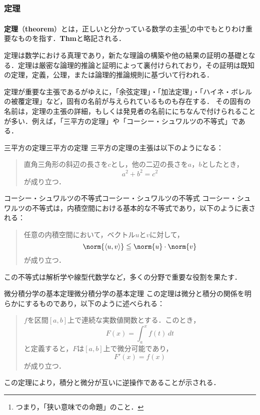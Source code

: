 \documentclass[a4paper,11pt]{ltjsarticle}
\renewcommand{\emph}[1]{\textbf{#1}}
\renewcommand{\leq}{\leqq}
\begin{document}
\subsubsection{定理}

\emph{定理}（\emph{theorem}）とは，正しいと分かっている数学の主張\footnote{つまり，「狭い意味での命題」のこと．}の中でもとりわけ重要なものを指す．\textbf{Thm}と略記される．


定理は数学における真理であり，新たな理論の構築や他の結果の証明の基礎となる．定理は厳密な論理的推論と証明によって裏付けられており，その証明は既知の定理，定義，公理，または論理的推論規則に基づいて行われる．

定理が重要な主張であるがゆえに，「余弦定理」・「加法定理」・「ハイネ・ボレルの被覆定理」など，固有の名前が与えられているものも存在する．
その固有の名前は，定理の主張の詳細，もしくは発見者の名前ににちなんで付けられることが多い．例えば，「三平方の定理」や「コーシー・シュワルツの不等式」である．

\begin{example}{三平方の定理}{三平方の定理}
	三平方の定理の主張は以下のようになる：
	\begin{quotation}
    直角三角形の斜辺の長さを$c$とし，他の二辺の長さを$a$，$b$としたとき，
    \[
        a^2+b^2=c^2
    \]
    が成り立つ．
\end{quotation}
\end{example}
  
  \begin{example}{コーシー・シュワルツの不等式}{コーシー・シュワルツの不等式}
  コーシー・シュワルツの不等式は，内積空間における基本的な不等式であり，以下のように表される：
  \begin{quotation}
  任意の内積空間において，ベクトル$u$と$v$に対して，
  \[
  \norm{\langle u, v \rangle} \leq \norm{u} \cdot \norm{v}
  \]
  が成り立つ．
  \end{quotation}
  この不等式は解析学や線型代数学など，多くの分野で重要な役割を果たす．
  \end{example}
  
  \begin{example}{微分積分学の基本定理}{微分積分学の基本定理}
  この定理は微分と積分の関係を明らかにするものであり，以下のように述べられる：
  \begin{quotation}
  $f$を区間$[a, b]$上で連続な実数値関数とする．このとき，
  \[
  F(x) = \int_a^x f(t) \, dt
  \]
  と定義すると，$F$は$[a, b]$上で微分可能であり，
  \[
  F'(x) = f(x)
  \]
  が成り立つ．
  \end{quotation}
  この定理により，積分と微分が互いに逆操作であることが示される．
  \end{example}
\end{document}
